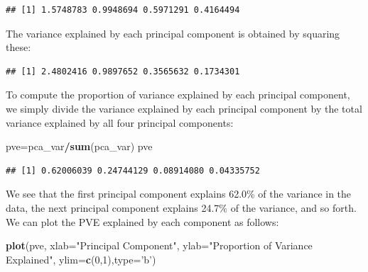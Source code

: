 \documentclass[
  openany]{book}
\newenvironment{Shaded}{\begin{snugshade}}{\end{snugshade}}
\newcommand{\DataTypeTok}[1]{\textcolor[rgb]{0.13,0.29,0.53}{#1}}
\newcommand{\DecValTok}[1]{\textcolor[rgb]{0.00,0.00,0.81}{#1}}
\newcommand{\KeywordTok}[1]{\textcolor[rgb]{0.13,0.29,0.53}{\textbf{#1}}}
\newcommand{\NormalTok}[1]{#1}
\newcommand{\OperatorTok}[1]{\textcolor[rgb]{0.81,0.36,0.00}{\textbf{#1}}}
\newcommand{\StringTok}[1]{\textcolor[rgb]{0.31,0.60,0.02}{#1}}
\begin{document}
\begin{Shaded}
\end{Shaded}

\begin{verbatim}
## [1] 1.5748783 0.9948694 0.5971291 0.4164494
\end{verbatim}

The variance explained by each principal component is obtained by squaring
these:

\begin{Shaded}
\end{Shaded}

\begin{verbatim}
## [1] 2.4802416 0.9897652 0.3565632 0.1734301
\end{verbatim}

To compute the proportion of variance explained by each principal component,
we simply divide the variance explained by each principal component
by the total variance explained by all four principal components:

\begin{Shaded}
\begin{Highlighting}[]
\NormalTok{pve=pca_var}\OperatorTok{/}\KeywordTok{sum}\NormalTok{(pca_var)}
\NormalTok{pve}
\end{Highlighting}
\end{Shaded}

\begin{verbatim}
## [1] 0.62006039 0.24744129 0.08914080 0.04335752
\end{verbatim}

We see that the first principal component explains 62.0\% of the variance
in the data, the next principal component explains 24.7\% of the variance,
and so forth. We can plot the PVE explained by each component as follows:

\begin{Shaded}
\begin{Highlighting}[]
\KeywordTok{plot}\NormalTok{(pve, }\DataTypeTok{xlab=}\StringTok{"Principal Component"}\NormalTok{, }\DataTypeTok{ylab=}\StringTok{"Proportion of Variance Explained"}\NormalTok{, }\DataTypeTok{ylim=}\KeywordTok{c}\NormalTok{(}\DecValTok{0}\NormalTok{,}\DecValTok{1}\NormalTok{),}\DataTypeTok{type=}\StringTok{'b'}\NormalTok{)}
\end{Highlighting}
\end{Shaded}
\end{document}
